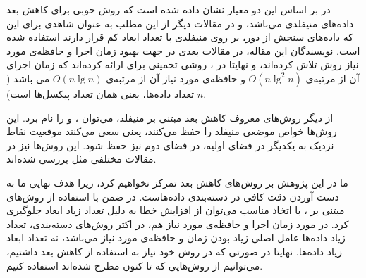 \documentclass[11pt]{article}
\begin{document}
در \cite{Bachmann_exploiting} بر اساس این دو معیار نشان داده شده است که \isomap{} روش خوبی برای کاهش بعد داده‌های منیفلدی می‌باشد، و در مقالات دیگر از این مطلب به عنوان شاهدی برای این که داده‌های سنجش از دور، بر روی منیفلدی با تعداد ابعاد کم قرار دارند استفاده شده است. نویسندگان این مقاله، در مقالات بعدی در جهت بهبود زمان اجرا و حافظه‌ی مورد نیاز روش \isomap{} تلاش کرده‌اند، و نهایتا در \cite{Bachmann_improved}، روشی تخمینی برای \isomap{} ارائه کرده‌اند که زمان اجرای آن از مرتبه‌ی
 $O(n\lg^2n)$
و حافظه‌ی مورد نیاز آن از مرتبه‌ی
$O(n\lg{n})$
می باشد 
($n$ تعداد داده‌ها، یعنی همان تعداد پیکسل‌ها است).

از دیگر روش‌های معروف کاهش بعد مبتنی بر منیفلد، می‌توان  \lle{}، \LTSA{} و \LapEig{} را نام برد. این روش‌ها خواص موضعی منیفلد را حفظ می‌کنند، یعنی سعی می‌کنند موقعیت نقاط نزدیک به یکدیگر در فضای اولیه، در فضای دوم نیز حفظ شود. این روش‌ها نیز در مقالات مختلفی مثل \cite{LLE1,LTS_1,LTS_2,Crawford_LML} بررسی شده‌اند.

ما در این پژوهش بر روش‌های کاهش بعد تمرکز نخواهیم کرد، زیرا هدف نهایی ما به دست آوردن دقت کافی در دسته‌بندی داده‌هاست. در ضمن با استفاده از روش‌های مبتنی بر ، با اتخاذ  مناسب می‌توان از افزایش خطا به دلیل تعداد زیاد ابعاد جلوگیری کرد. در مورد زمان اجرا و حافظه‌ی مورد نیاز هم، در اکثر روش‌های دسته‌بندی، تعداد زیاد داده‌ها عامل اصلی زیاد بودن زمان و حافظه‌ی مورد نیاز می‌باشد، نه تعداد ابعاد زیاد داده‌ها. نهایتا در صورتی که در روش خود نیاز به استفاده از کاهش بعد داشتیم، می‌توانیم از روش‌هایی که تا کنون مطرح شده‌اند استفاده کنیم. 
\end{document}
